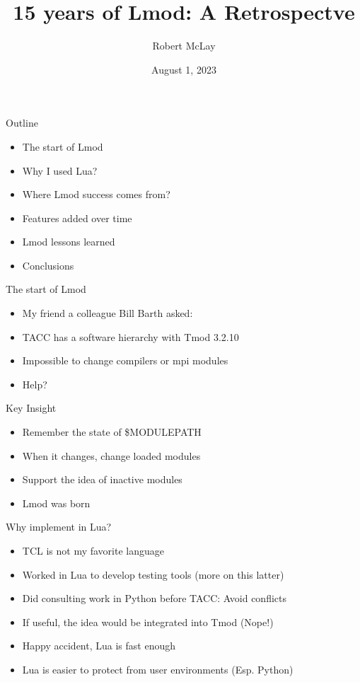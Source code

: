 \documentclass{beamer}
\begin{document}
\title[Lmod]{15 years of Lmod: A Retrospectve}
\author{Robert McLay} 
\date{August 1, 2023}

\frame{\titlepage} 


\begin{frame}{Outline}
  \begin{itemize}
    \item The start of Lmod
    \item Why I used Lua?
    \item Where Lmod success comes from?
    \item Features added over time
    \item Lmod lessons learned
    \item Conclusions
  \end{itemize}
\end{frame}

\begin{frame}{The start of Lmod}
  \begin{itemize}
    \item My friend a colleague Bill Barth asked:
    \item TACC has a software hierarchy with Tmod 3.2.10
    \item Impossible to change compilers or mpi modules
    \item Help?
  \end{itemize}
\end{frame}

\begin{frame}{Key Insight}
  \begin{itemize}
    \item Remember the state of \$MODULEPATH
    \item When it changes, change loaded modules
    \item Support the idea of inactive modules
    \item Lmod was born
  \end{itemize}
\end{frame}

\begin{frame}{Why implement in Lua?}
  \begin{itemize}
    \item TCL is not my favorite language
    \item Worked in Lua to develop testing tools (more on this latter)
    \item Did consulting work in Python before TACC: Avoid conflicts
    \item If useful, the idea would be integrated into Tmod (Nope!)
    \item Happy accident, Lua is fast enough
    \item Lua is easier to protect from user environments (Esp. Python)
  \end{itemize}
\end{frame}
\end{document}
